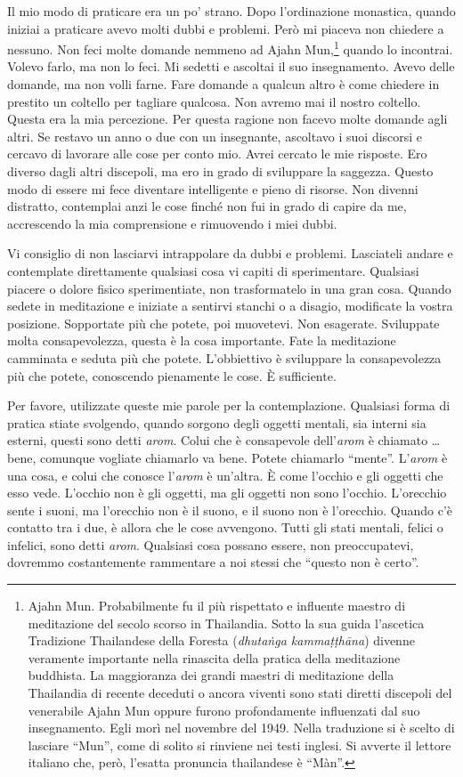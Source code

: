 Il mio modo di praticare era un po' strano. Dopo l'ordinazione
monastica, quando iniziai a praticare avevo molti dubbi e problemi. Però
mi piaceva non chiedere a nessuno. Non feci molte domande nemmeno ad
Ajahn Mun,\footnote{Ajahn Mun. Probabilmente fu il più rispettato e
  influente maestro di meditazione del secolo scorso in Thailandia.
  Sotto la sua guida l'ascetica Tradizione Thailandese della Foresta
  (\emph{dhutaṅga kammaṭṭhāna}) divenne veramente importante nella
  rinascita della pratica della meditazione buddhista. La maggioranza
  dei grandi maestri di meditazione della Thailandia di recente deceduti
  o ancora viventi sono stati diretti discepoli del venerabile Ajahn Mun
  oppure furono profondamente influenzati dal suo insegnamento. Egli
  morì nel novembre del 1949. Nella traduzione si è scelto di lasciare
  ``Mun'', come di solito si rinviene nei testi inglesi. Si avverte il
  lettore italiano che, però, l'esatta pronuncia thailandese è ``Màn''.}
quando lo incontrai. Volevo farlo, ma non lo feci. Mi sedetti e ascoltai
il suo insegnamento. Avevo delle domande, ma non volli farne. Fare
domande a qualcun altro è come chiedere in prestito un coltello per
tagliare qualcosa. Non avremo mai il nostro coltello. Questa era la mia
percezione. Per questa ragione non facevo molte domande agli altri. Se
restavo un anno o due con un insegnante, ascoltavo i suoi discorsi e
cercavo di lavorare alle cose per conto mio. Avrei cercato le mie
risposte. Ero diverso dagli altri discepoli, ma ero in grado di
sviluppare la saggezza. Questo modo di essere mi fece diventare
intelligente e pieno di risorse. Non divenni distratto, contemplai anzi
le cose finché non fui in grado di capire da me, accrescendo la mia
comprensione e rimuovendo i miei dubbi.

Vi consiglio di non lasciarvi intrappolare da dubbi e problemi.
Lasciateli andare e contemplate direttamente qualsiasi cosa vi capiti di
sperimentare. Qualsiasi piacere o dolore fisico sperimentiate, non
trasformatelo in una gran cosa. Quando sedete in meditazione e iniziate
a sentirvi stanchi o a disagio, modificate la vostra posizione.
Sopportate più che potete, poi muovetevi. Non esagerate. Sviluppate
molta consapevolezza, questa è la cosa importante. Fate la meditazione
camminata e seduta più che potete. L'obbiettivo è sviluppare la
consapevolezza più che potete, conoscendo pienamente le cose. È
sufficiente.

Per favore, utilizzate queste mie parole per la contemplazione.
Qualsiasi forma di pratica stiate svolgendo, quando sorgono degli
oggetti mentali, sia interni sia esterni, questi sono detti \emph{arom}.
Colui che è consapevole dell'\emph{arom} è chiamato \ldots{} bene, comunque
vogliate chiamarlo va bene. Potete chiamarlo ``mente''. L'\emph{arom} è
una cosa, e colui che conosce l'\emph{arom} è un'altra. È come l'occhio
e gli oggetti che esso vede. L'occhio non è gli oggetti, ma gli oggetti
non sono l'occhio. L'orecchio sente i suoni, ma l'orecchio non è il
suono, e il suono non è l'orecchio. Quando c'è contatto tra i due, è
allora che le cose avvengono. Tutti gli stati mentali, felici o
infelici, sono detti \emph{arom}. Qualsiasi cosa possano essere, non
preoccupatevi, dovremmo costantemente rammentare a noi stessi che
``questo non è certo''.

